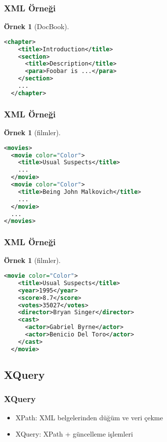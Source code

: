 \documentclass[dvipsnames]{beamer}
\theoremstyle{definition}
\theoremstyle{example}
\newtheorem{ornek}[theorem]{Örnek}
\theoremstyle{plain}
\begin{document}
\begin{frame}[fragile]
  \frametitle{XML Örneği}

  \begin{ornek}[DocBook]
    \begin{lstlisting}[language=XML]
  <chapter>
    <title>Introduction</title>
    <section>
      <title>Description</title>
      <para>Foobar is ...</para>
    </section>
    ...
  </chapter>
    \end{lstlisting}
  \end{ornek}
\end{frame}

\begin{frame}[fragile]
  \frametitle{XML Örneği}

  \begin{ornek}[filmler]
    \begin{lstlisting}[language=XML]
<movies>
  <movie color="Color">
    <title>Usual Suspects</title>
    ...
  </movie>
  <movie color="Color">
    <title>Being John Malkovich</title>
    ...
  </movie>
  ...
</movies>
    \end{lstlisting}
  \end{ornek}
\end{frame}

\begin{frame}[fragile]
  \frametitle{XML Örneği}

  \begin{ornek}[filmler]
    \begin{lstlisting}[language=XML]
  <movie color="Color">
    <title>Usual Suspects</title>
    <year>1995</year>
    <score>8.7</score>
    <votes>35027</votes>
    <director>Bryan Singer</director>
    <cast>
      <actor>Gabriel Byrne</actor>
      <actor>Benicio Del Toro</actor>
    </cast>
  </movie>
    \end{lstlisting}
  \end{ornek}
\end{frame}

\subsection{XQuery}

\begin{frame}
  \frametitle{XQuery}

  \begin{itemize}
    \item XPath: XML belgelerinden düğüm ve veri çekme
    \item XQuery: XPath + güncelleme işlemleri
  \end{itemize}
\end{frame}
\end{document}
